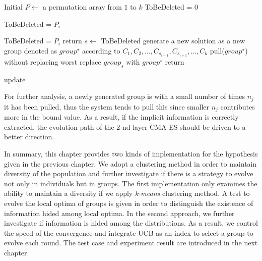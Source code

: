 \begin{algorithm}
  Initial $P\leftarrow $ a permutation array from $1$ to $k$\; 
  ToBeDeleted = $0$\;
  {
    {
	    ToBeDeleted = $P_i$\; 
    }  

   }
   {
      {
        {
	        ToBeDeleted = $P_i$\;
        } 
      } 
    } 
    { 
      return\; 
    } 
    \Else
  	{ 
      $s\leftarrow$ ToBeDeleted\; 
      generate a new solution as a new group	denoted as $group^\star$ according to $C_1, C_2,\ldots, C_{s_{i-1}}, C_{s_{i+1}},\ldots, C_k$ \; 
      { pull($group^\star$) without replacing worst\; }
	replace $group_{s}$ with $group^\star$\; return\; 
} 
\caption{update}
\end{algorithm}

For further analysis, a newly generated group is with a small
number of times $n_j$ it has been pulled, thus the system tends to
pull this since smaller $n_j$ contributes more in the
bound value. As a result, if the implicit information is correctly
extracted, the evolution path of the 2-nd layer CMA-ES should be
driven to a better direction.  

In summary, this chapter provides two kinds of implementation for
the hypothesis given in the previous chapter. We adopt a clustering
method in order to maintain diversity of the population and further
investigate if there is a strategy to evolve not only in individuals
but in groups. The first implementation only examines the ability to
maintain a diversity if we apply \emph{k-means} clustering method. A
test to evolve the local optima of groups is given in order to
distinguish the existence of information hided among local optima.
In the second approach, we further investigate if information is
hided among the distributions. As a result, we control the speed of
the convergence and integrate UCB as an index to select a group to
evolve each round. The test case and experiment result are
introduced in the next chapter.
